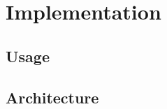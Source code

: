 \chapter{Implementation}
\label{ch:impl}


\section{Usage}
\label{ch:impl-usage}


\section{Architecture}
\label{ch:impl-arch}

